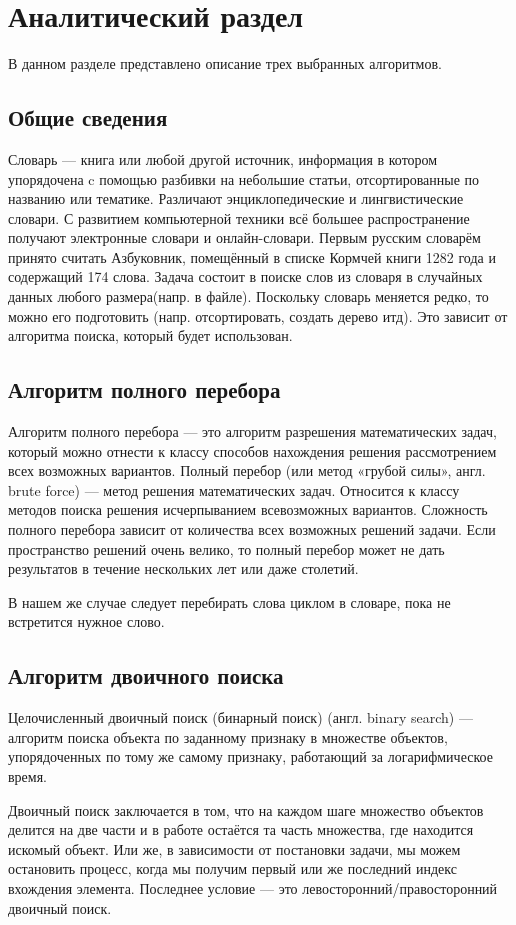 \documentclass[14pt, a4paper]{extarticle}
\begin{document}
\clearpage
\section{Аналитический раздел}
В данном разделе представлено описание трех выбранных алгоритмов.
\subsection{Общие сведения}
Словарь — книга или любой другой источник, информация в котором упорядочена c помощью разбивки на небольшие статьи, отсортированные по названию или тематике. Различают энциклопедические и лингвистические словари.
С развитием компьютерной техники всё большее распространение получают электронные словари и онлайн-словари.
Первым русским словарём принято считать Азбуковник, помещённый в списке Кормчей книги 1282 года и содержащий 174 слова. Задача состоит в поиске слов из словаря в случайных данных любого размера(напр. в файле).
Поскольку словарь меняется редко, то можно его подготовить (напр. отсортировать, создать дерево итд). Это зависит от алгоритма поиска, который будет использован. 
\subsection{Алгоритм полного перебора}
Алгоритм полного перебора — это алгоритм разрешения математических задач, который можно отнести к классу способов нахождения решения рассмотрением всех возможных вариантов. Полный перебор (или метод «грубой силы», англ. brute force) — метод решения математических задач. Относится к классу методов поиска решения исчерпыванием всевозможных вариантов. Сложность полного перебора зависит от количества всех возможных решений задачи. Если пространство решений очень велико, то полный перебор может не дать результатов в течение нескольких лет или даже столетий.\par
В нашем же случае следует перебирать слова циклом в словаре, пока не встретится нужное слово.
\subsection{Алгоритм двоичного поиска}
Целочисленный двоичный поиск (бинарный поиск) (англ. binary search) — алгоритм поиска объекта по заданному признаку в множестве объектов, упорядоченных по тому же самому признаку, работающий за логарифмическое время.\par
Двоичный поиск заключается в том, что на каждом шаге множество объектов делится на две части и в работе остаётся та часть множества, где находится искомый объект. Или же, в зависимости от постановки задачи, мы можем остановить процесс, когда мы получим первый или же последний индекс вхождения элемента. Последнее условие — это левосторонний/правосторонний двоичный поиск. 
\end{document}
